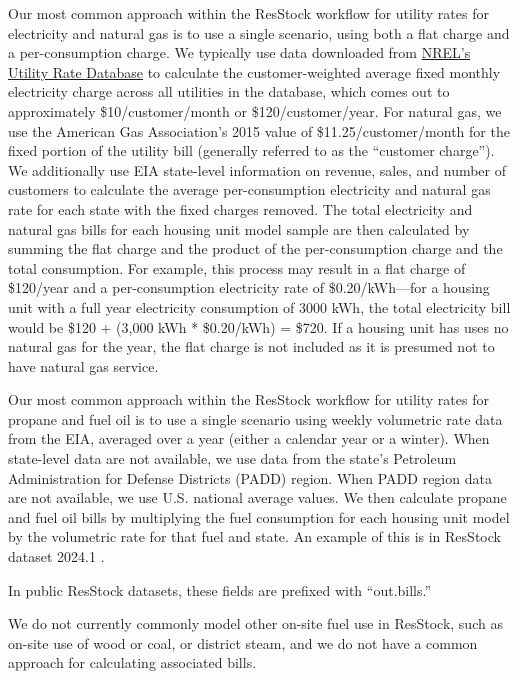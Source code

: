 Our most common approach within the ResStock workflow for utility rates for electricity and natural gas is to use a single scenario, using both a flat charge and a per-consumption charge. We typically use data downloaded from \href{https://openei.org/wiki/Utility_Rate_Database}{NREL's Utility Rate Database} to calculate the customer-weighted average fixed monthly electricity charge across all utilities in the database, which comes out to approximately \$10/customer/month or \$120/customer/year. For natural gas, we use the American Gas Association's 2015 value of \$11.25/customer/month for the fixed portion of the utility bill (generally referred to as the ``customer charge''). We additionally use EIA state-level information on revenue, sales, and number of customers to calculate the average per-consumption electricity and natural gas rate for each state with the fixed charges removed. The total electricity and natural gas bills for each housing unit model sample are then calculated by summing the flat charge and the product of the per-consumption charge and the total consumption. For example, this process may result in a flat charge of \$120/year and a per-consumption electricity rate of \$0.20/kWh---for a housing unit with a full year electricity consumption of 3000 kWh, the total electricity bill would be \$120 + (3,000 kWh * \$0.20/kWh) = \$720. If a housing unit has uses no natural gas for the year, the flat charge is not included as it is presumed not to have natural gas service. 

Our most common approach within the ResStock workflow for utility rates for propane and fuel oil is to use a single scenario using weekly volumetric rate data from the EIA, averaged over a year (either a calendar year or a winter). When state-level data are not available, we use data from the state's Petroleum Administration for Defense Districts (PADD) region. When PADD region data are not available, we use U.S. national average values. We then calculate propane and fuel oil bills by multiplying the fuel consumption for each housing unit model by the volumetric rate for that fuel and state. An example of this is in ResStock dataset 2024.1 \citep{Present2024}.

In public ResStock datasets, these fields are prefixed with ``out.bills.''

We do not currently commonly model other on-site fuel use in ResStock, such as on-site use of wood or coal, or district steam, and we do not have a common approach for calculating associated bills.%

